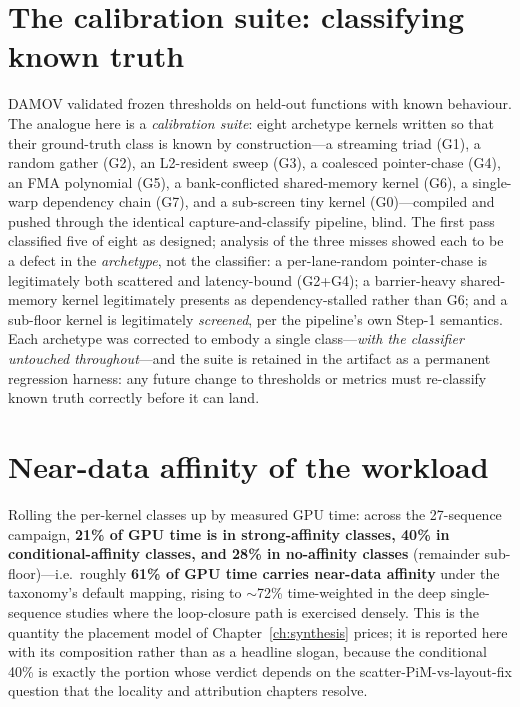 \section{The calibration suite: classifying known truth}
\label{sec:char-calibration}

DAMOV validated frozen thresholds on held-out functions with known
behaviour. The analogue here is a \emph{calibration suite}: eight archetype
kernels written so that their ground-truth class is known by
construction---a streaming triad (G1), a random gather (G2), an L2-resident
sweep (G3), a coalesced pointer-chase (G4), an FMA polynomial (G5), a
bank-conflicted shared-memory kernel (G6), a single-warp dependency chain
(G7), and a sub-screen tiny kernel (G0)---compiled and pushed through the
identical capture-and-classify pipeline, blind. The first pass classified
five of eight as designed; analysis of the three misses showed each to be a
defect in the \emph{archetype}, not the classifier: a per-lane-random
pointer-chase is legitimately both scattered and latency-bound (G2+G4); a
barrier-heavy shared-memory kernel legitimately presents as
dependency-stalled rather than G6; and a sub-floor kernel is legitimately
\emph{screened}, per the pipeline's own Step-1 semantics. Each archetype was
corrected to embody a single class---\emph{with the classifier untouched
throughout}---and the suite is retained in the artifact as a permanent
regression harness: any future change to thresholds or metrics must
re-classify known truth correctly before it can land.

\section{Near-data affinity of the workload}
\label{sec:char-affinity}

Rolling the per-kernel classes up by measured GPU time: across the
27-sequence campaign, \textbf{21\% of GPU time is in strong-affinity classes,
40\% in conditional-affinity classes, and 28\% in no-affinity classes}
(remainder sub-floor)---i.e.\ roughly \textbf{61\% of GPU time carries
near-data affinity} under the taxonomy's default mapping, rising to
$\sim$72\% time-weighted in the deep single-sequence studies where the
loop-closure path is exercised densely. This is the quantity the placement
model of Chapter~\ref{ch:synthesis} prices; it is reported here with its
composition rather than as a headline slogan, because the conditional 40\%
is exactly the portion whose verdict depends on the scatter-PiM-vs-layout-fix
question that the locality and attribution chapters resolve.

